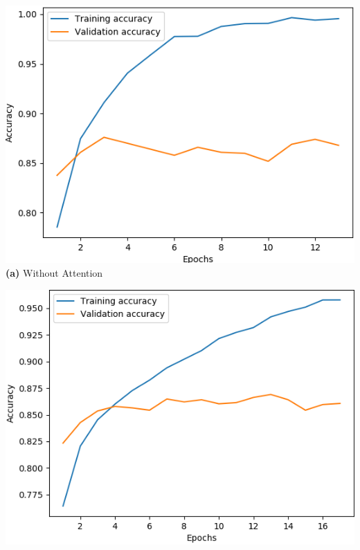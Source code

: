 \documentclass[12pt,a4paper]{article}
\begin{document}
\hspace{-5pt}\begin{minipage}{0.5\textwidth}
	\vspace{2pt}\begin{minipage}{0.48\textwidth}
		\begin{center}
			\hspace{-1cm}\includegraphics[width=1\textwidth]{Images/lstm.png}\\
			\hspace{-1cm}\textbf{(a)} Without Attention\\
		\end{center}
	\end{minipage}
	\vspace{2pt}\begin{minipage}{0.48\textwidth}
		\begin{center}
			\hspace{-1cm}\includegraphics[width=1\textwidth]{Images/attention-lstm.png}\\

\end{center}
\end{minipage}
\end{minipage}
\end{document}
